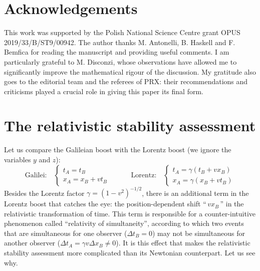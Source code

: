 \documentclass[a4paper, amsfonts, amssymb, amsmath, reprint, showkeys,  twoside, onecolumn,notitlepage,nofootinbib]{revtex4-1}
\newcommand{\spc}{\quad \quad \quad}
\theoremstyle{definition}
\theoremstyle{theorem}
\begin{document}
 


\section*{Acknowledgements}

This work was supported by the Polish National Science Centre grant OPUS 2019/33/B/ST9/00942. The author thanks M. Antonelli, B. Haskell and F. Bemfica for reading the manuscript and providing useful comments. I am particularly grateful to M. Disconzi, whose observations have allowed me to significantly improve the mathematical rigour of the discussion. My gratitude also goes to the editorial team and the referees of PRX: their recommendations and criticisms played a crucial role in giving this paper its final form.




\appendix


\section{The relativistic stability assessment}\label{AAAAAAAAA}


Let us compare the Galileian boost with the Lorentz boost (we ignore the variables $y$ and $z$):
\begin{equation}\label{TXxt}
\text{Galilei:} \quad
    \begin{cases}
      t_A=t_B \\
      x_A=x_B+v  t_B
    \end{cases}
    \spc
    \text{Lorentz:} \quad
        \begin{cases}
      t_A=\gamma (t_B + v x_B)\\
      x_A=\gamma (x_B + v t_B)
    \end{cases}
\end{equation}
Besides the Lorentz factor $\gamma=(1-v^2)^{-1/2}$, there is an additional term in the Lorentz boost that catches the eye: the position-dependent shift ``$\, vx_B \,$'' in the relativistic transformation of time. This term is responsible for a counter-intuitive phenomenon called ``relativity of simultaneity'', according to which two events that are simultaneous for one observer ($\Delta t_B=0$) may not be simultaneous for another observer ($\Delta t_A = \gamma v \Delta x_B \neq 0$). It is  this effect that makes the relativistic stability assessment more complicated than its Newtonian counterpart. Let us see why. 
\end{document}
